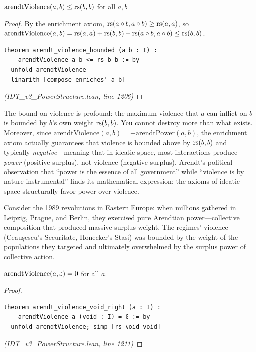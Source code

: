 \begin{theorem}
\label{thm:violence-bounded}
$\mathrm{arendtViolence}(a, b) \leq \mathrm{rs}(b, b)$ for all $a, b$.
\end{theorem}

\begin{proof}
By the enrichment axiom, $\mathrm{rs}(a \circ b, a \circ b) \geq \mathrm{rs}(a,a)$,
so $\mathrm{arendtViolence}(a,b) = \mathrm{rs}(a,a) + \mathrm{rs}(b,b) - \mathrm{rs}(a \circ b, a \circ b)
\leq \mathrm{rs}(b,b)$.
\begin{lstlisting}
theorem arendt_violence_bounded (a b : I) :
    arendtViolence a b <= rs b b := by
  unfold arendtViolence
  linarith [compose_enriches' a b]
\end{lstlisting}
\textit{(IDT\_v3\_PowerStructure.lean, line 1206)}
\end{proof}

\begin{interpretation}
The bound on violence is profound: the maximum violence that $a$ can inflict
on $b$ is bounded by $b$'s own weight $\mathrm{rs}(b,b)$. You cannot destroy more than
what exists. Moreover, since $\mathrm{arendtViolence}(a,b) = -\mathrm{arendtPower}(a,b)$,
the enrichment axiom actually guarantees that violence is bounded above by
$\mathrm{rs}(b,b)$ and typically \emph{negative}---meaning that in ideatic space,
most interactions produce \emph{power} (positive surplus), not violence
(negative surplus). Arendt's political observation that ``power is the essence
of all government'' while ``violence is by nature instrumental'' finds its
mathematical expression: the axioms of ideatic space structurally favor
power over violence.

Consider the 1989 revolutions in Eastern Europe: when millions gathered in
Leipzig, Prague, and Berlin, they exercised pure Arendtian power---collective
composition that produced massive surplus weight. The regimes' violence
(Ceaușescu's Securitate, Honecker's Stasi) was bounded by the weight of
the populations they targeted and ultimately overwhelmed by the surplus
power of collective action.
\end{interpretation}

\begin{theorem}
\label{thm:violence-void}
$\mathrm{arendtViolence}(a, \varepsilon) = 0$ for all $a$.
\end{theorem}

\begin{proof}
\begin{lstlisting}
theorem arendt_violence_void_right (a : I) :
    arendtViolence a (void : I) = 0 := by
  unfold arendtViolence; simp [rs_void_void]
\end{lstlisting}
\textit{(IDT\_v3\_PowerStructure.lean, line 1211)}
\end{proof}

